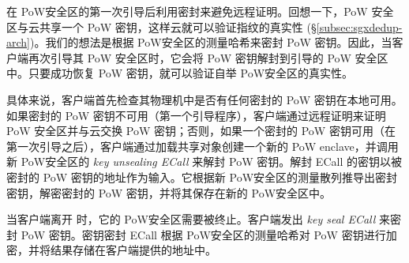 \sysnameS 在 PoW安全区的第一次引导后利用密封来避免远程证明。回想一下，PoW 安全区与云共享一个 PoW 密钥，这样云就可以验证指纹的真实性 (\S\ref{subsec:sgxdedup-arch})。我们的想法是根据 PoW安全区的测量哈希来密封 PoW 密钥。因此，当客户端再次引导其 PoW 安全区时，它会将 PoW 密钥解封到引导的 PoW 安全区中。只要成功恢复 PoW 密钥，就可以验证自举 PoW安全区的真实性。

具体来说，客户端首先检查其物理机中是否有任何密封的 PoW 密钥在本地可用。如果密封的 PoW 密钥不可用（第一个引导程序），客户端通过远程证明来证明 PoW 安全区并与云交换 PoW 密钥；否则，如果一个密封的 PoW 密钥可用（在第一次引导之后），客户端通过加载共享对象创建一个新的 PoW enclave，并调用新 PoW安全区的 \textit{ key unsealing ECall} 来解封 PoW 密钥。解封 ECall 的密钥以被密封的 PoW 密钥的地址作为输入。它根据新 PoW安全区的测量散列推导出密封密钥，解密密封的 PoW 密钥，并将其保存在新的 PoW安全区中。

当客户端离开 \sysnameS 时，它​​的 PoW安全区需要被终止。客户端发出 \textit{ key seal ECall} 来密封 PoW 密钥。密钥密封 ECall 根据 PoW安全区的测量哈希对 PoW 密钥进行加密，并将结果存储在客户端提供的地址中。